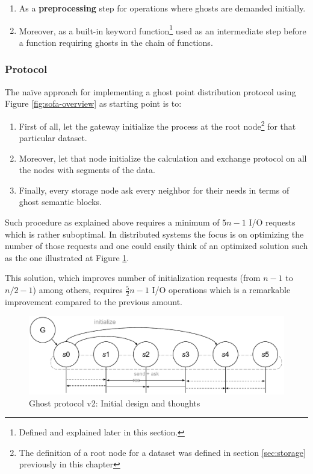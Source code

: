 \begin{enumerate}
	\item As a \textbf{preprocessing} step for operations where ghosts are demanded initially.
	\item Moreover, as a built-in keyword function\footnote{Defined and explained later in this section.} used as an intermediate step before a function requiring ghosts in the chain of functions.
\end{enumerate}

\subsubsection*{Protocol}
The naïve approach for implementing a ghost point distribution protocol using Figure \ref{fig:sofa-overview} as starting point is to:
\begin{enumerate}
	\item First of all, let the gateway initialize the process at the root node\footnote{The definition of a root node for a dataset was defined in section \ref{sec:storage} previously in this chapter} for that particular dataset.
	\item Moreover, let that node initialize the calculation and exchange protocol on all the nodes with segments of the data.
	\item Finally, every storage node ask every neighbor for their needs in terms of ghost semantic blocks.
\end{enumerate}
\vspace*{2mm}
Such procedure as explained above requires a minimum of $5n-1$ I/O requests which is rather suboptimal. In distributed systems the focus is on optimizing the number of those requests and one could easily think of an optimized solution such as the one illustrated at Figure \ref{fig:ghost-v1}. 

This solution, which improves number of initialization requests (from $n-1$ to $n/2-1$) among others, requires $\frac{5}{2}n-1$ I/O operations which is a remarkable improvement compared to the previous amount.

\begin{figure}[ht!]
	\centering
	\vspace*{3mm}
	\includegraphics[scale=0.68]{pdf/ghost-v1.pdf}
	\caption{Ghost protocol v2: Initial design and thoughts \label{fig:ghost-v1}}
	\vspace*{3mm}
\end{figure}	

